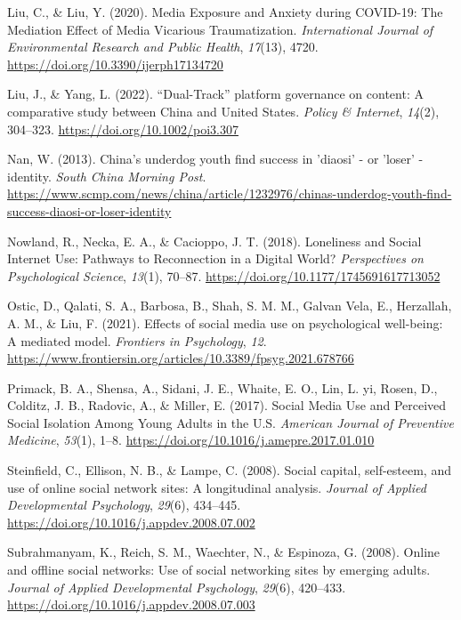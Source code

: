 \documentclass[]{interact}
\theoremstyle{plain}%
\theoremstyle{definition}
\theoremstyle{remark}
\newlength{\cslhangindent}
\newlength{\cslentryspacingunit} %
\newenvironment{CSLReferences}[2] %
 {%
  \setlength{\parindent}{0pt}
  \ifodd #1
  \let\oldpar\par
  \def\par{\hangindent=\cslhangindent\oldpar}
  \fi
  \setlength{\parskip}{#2\cslentryspacingunit}
 }%
 {}
\begin{document}
\begin{CSLReferences}{1}{0}
\leavevmode{}%
Liu, C., \& Liu, Y. (2020). Media Exposure and Anxiety during COVID-19:
The Mediation Effect of Media Vicarious Traumatization.
\emph{International Journal of Environmental Research and Public
Health}, \emph{17}(13), 4720.
\url{https://doi.org/10.3390/ijerph17134720}

\leavevmode{}%
Liu, J., \& Yang, L. (2022). {``}Dual-Track{''} platform governance on
content: A comparative study between China and United States.
\emph{Policy \& Internet}, \emph{14}(2), 304--323.
\url{https://doi.org/10.1002/poi3.307}

\leavevmode{}%
Nan, W. (2013). China's underdog youth find success in 'diaosi' - or
'loser' - identity. \emph{South China Morning Post}.
\url{https://www.scmp.com/news/china/article/1232976/chinas-underdog-youth-find-success-diaosi-or-loser-identity}

\leavevmode{}%
Nowland, R., Necka, E. A., \& Cacioppo, J. T. (2018). Loneliness and
Social Internet Use: Pathways to Reconnection in a Digital World?
\emph{Perspectives on Psychological Science}, \emph{13}(1), 70--87.
\url{https://doi.org/10.1177/1745691617713052}

\leavevmode{}%
Ostic, D., Qalati, S. A., Barbosa, B., Shah, S. M. M., Galvan Vela, E.,
Herzallah, A. M., \& Liu, F. (2021). Effects of social media use on
psychological well-being: A mediated model. \emph{Frontiers in
Psychology}, \emph{12}.
\url{https://www.frontiersin.org/articles/10.3389/fpsyg.2021.678766}

\leavevmode{}%
Primack, B. A., Shensa, A., Sidani, J. E., Whaite, E. O., Lin, L. yi,
Rosen, D., Colditz, J. B., Radovic, A., \& Miller, E. (2017). Social
Media Use and Perceived Social Isolation Among Young Adults in the U.S.
\emph{American Journal of Preventive Medicine}, \emph{53}(1), 1--8.
\url{https://doi.org/10.1016/j.amepre.2017.01.010}

\leavevmode{}%
Steinfield, C., Ellison, N. B., \& Lampe, C. (2008). Social capital,
self-esteem, and use of online social network sites: A longitudinal
analysis. \emph{Journal of Applied Developmental Psychology},
\emph{29}(6), 434--445.
\url{https://doi.org/10.1016/j.appdev.2008.07.002}

\leavevmode{}%
Subrahmanyam, K., Reich, S. M., Waechter, N., \& Espinoza, G. (2008).
Online and offline social networks: Use of social networking sites by
emerging adults. \emph{Journal of Applied Developmental Psychology},
\emph{29}(6), 420--433.
\url{https://doi.org/10.1016/j.appdev.2008.07.003}


\end{CSLReferences}
\end{document}
